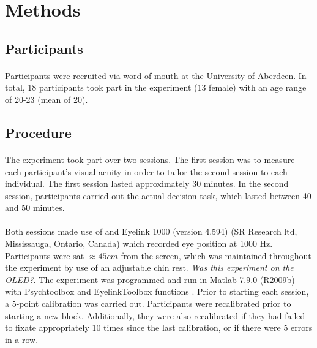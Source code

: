 \documentclass[12pt]{article}
\begin{document}
\section*{Methods}

\subsection*{Participants}
\paragraph{} Participants were recruited via word of mouth at the University of Aberdeen. In total, 18 participants took part in the experiment (13 female) with an age range of 20-23 (mean of 20). 

\subsection*{Procedure}
\paragraph{} The experiment took part over two sessions. The first session was to measure each participant's visual acuity in order to tailor the second session to each individual. The first session lasted approximately 30 minutes. In the second session, participants carried out the actual decision task, which lasted between 40 and 50 minutes. 

\paragraph{} Both sessions made use of and Eyelink 1000 (version 4.594) (SR Research ltd, Mississauga, Ontario, Canada) which recorded eye position at 1000 Hz. Participants were sat $\approx45cm$ from the screen, which was maintained throughout the experiment by use of an adjustable chin rest. \textit{Was this experiment on the OLED?}. The experiment was programmed and run in Matlab 7.9.0 (R2009b) with Psychtoolbox \citep{pelli1997videotoolbox} and EyelinkToolbox functions \citep{cornelissen2002eyelink}. Prior to starting each session, a 5-point calibration was carried out. Participants were recalibrated prior to starting a new block. Additionally, they were also recalibrated if they had failed to fixate appropriately 10 times since the last calibration, or if there were 5 errors in a row.
\end{document}
